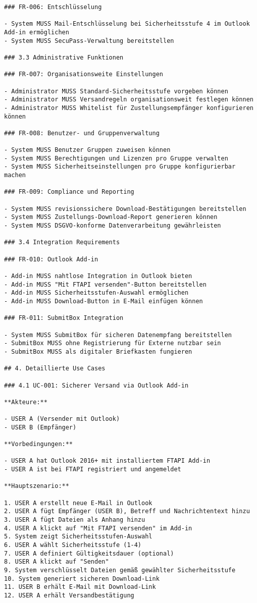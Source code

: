 \begin{Verbatim}[breaklines=true]
### FR-006: Entschlüsselung

- System MUSS Mail-Entschlüsselung bei Sicherheitsstufe 4 im Outlook Add-in ermöglichen
- System MUSS SecuPass-Verwaltung bereitstellen

### 3.3 Administrative Funktionen

### FR-007: Organisationsweite Einstellungen

- Administrator MUSS Standard-Sicherheitsstufe vorgeben können
- Administrator MUSS Versandregeln organisationsweit festlegen können
- Administrator MUSS Whitelist für Zustellungsempfänger konfigurieren können

### FR-008: Benutzer- und Gruppenverwaltung

- System MUSS Benutzer Gruppen zuweisen können
- System MUSS Berechtigungen und Lizenzen pro Gruppe verwalten
- System MUSS Sicherheitseinstellungen pro Gruppe konfigurierbar machen

### FR-009: Compliance und Reporting

- System MUSS revisionssichere Download-Bestätigungen bereitstellen
- System MUSS Zustellungs-Download-Report generieren können
- System MUSS DSGVO-konforme Datenverarbeitung gewährleisten

### 3.4 Integration Requirements

### FR-010: Outlook Add-in

- Add-in MUSS nahtlose Integration in Outlook bieten
- Add-in MUSS "Mit FTAPI versenden"-Button bereitstellen
- Add-in MUSS Sicherheitsstufen-Auswahl ermöglichen
- Add-in MUSS Download-Button in E-Mail einfügen können

### FR-011: SubmitBox Integration

- System MUSS SubmitBox für sicheren Datenempfang bereitstellen
- SubmitBox MUSS ohne Registrierung für Externe nutzbar sein
- SubmitBox MUSS als digitaler Briefkasten fungieren

## 4. Detaillierte Use Cases

### 4.1 UC-001: Sicherer Versand via Outlook Add-in

**Akteure:**

- USER A (Versender mit Outlook)
- USER B (Empfänger)

**Vorbedingungen:**

- USER A hat Outlook 2016+ mit installiertem FTAPI Add-in
- USER A ist bei FTAPI registriert und angemeldet

**Hauptszenario:**

1. USER A erstellt neue E-Mail in Outlook
2. USER A fügt Empfänger (USER B), Betreff und Nachrichtentext hinzu
3. USER A fügt Dateien als Anhang hinzu
4. USER A klickt auf "Mit FTAPI versenden" im Add-in
5. System zeigt Sicherheitsstufen-Auswahl
6. USER A wählt Sicherheitsstufe (1-4)
7. USER A definiert Gültigkeitsdauer (optional)
8. USER A klickt auf "Senden"
9. System verschlüsselt Dateien gemäß gewählter Sicherheitsstufe
10. System generiert sicheren Download-Link
11. USER B erhält E-Mail mit Download-Link
12. USER A erhält Versandbestätigung


\end{Verbatim}

